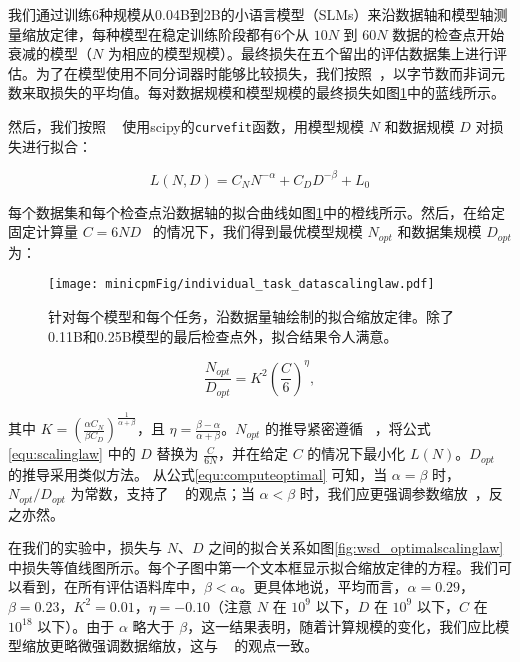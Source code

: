 我们通过训练6种规模从0.04B到2B的小语言模型（SLMs）来沿数据轴和模型轴测量缩放定律，每种模型在稳定训练阶段都有6个从 $10N$ 到 $60N$ 数据的检查点开始衰减的模型（$N$ 为相应的模型规模）。最终损失在五个留出的评估数据集上进行评估。为了在模型使用不同分词器时能够比较损失，我们按照~\cite{achiam2023gpt}，以字节数而非词元数来取损失的平均值。每对数据规模和模型规模的最终损失如图\ref{fig:individual_task_datascalinglaw}中的蓝线所示。 

然后，我们按照 ~\cite{hoffmann2022training} 使用scipy的\texttt{curvefit}函数，用模型规模 $N$ 和数据规模 $D$ 对损失进行拟合：

\begin{equation}
    L(N, D) = C_NN^{-\alpha} + C_DD^{-\beta} + L_0
\label{equ:scalinglaw}
\end{equation}

每个数据集和每个检查点沿数据轴的拟合曲线如图\ref{fig:individual_task_datascalinglaw}中的橙线所示。然后，在给定固定计算量 $C = 6ND$~\citep{rae2021scaling} 的情况下，我们得到最优模型规模 $N_{opt}$ 和数据集规模 $D_{opt}$ 为： 
\begin{figure}
    \centering
    \texttt{[image: minicpmFig/individual\_task\_datascalinglaw.pdf]}
    \caption{针对每个模型和每个任务，沿数据量轴绘制的拟合缩放定律。除了0.11B和0.25B模型的最后检查点外，拟合结果令人满意。}
    \label{fig:individual_task_datascalinglaw}
\end{figure}


\begin{equation}
    \frac{N_{opt}}{D_{opt}} = K^2\left(\frac{C}{6}\right)^{\eta},
\label{equ:computeoptimal}
\end{equation}

其中 $K = (\frac{\alpha C_N}{\beta C_D})^{\frac{1}{\alpha + \beta}} $，且 $\eta=\frac{\beta - \alpha}{\alpha + \beta}$。$N_{opt}$ 的推导紧密遵循 ~\cite{hoffmann2022training}，将公式\ref{equ:scalinglaw} 中的 $D$ 替换为 $\frac{C}{6N}$，并在给定 $C$ 的情况下最小化 $L(N)$。$D_{opt}$ 的推导采用类似方法。 
从公式\ref{equ:computeoptimal} 可知，当 $\alpha = \beta$ 时，$N_{opt}/D_{opt}$ 为常数，支持了 ~\cite{hoffmann2022training} 的观点；当 $\alpha < \beta$ 时，我们应更强调参数缩放~\citep{kaplan2020scaling}，反之亦然。 

在我们的实验中，损失与 $N$、$D$ 之间的拟合关系如图\ref{fig:wsd_optimalscalinglaw} 中损失等值线图所示。每个子图中第一个文本框显示拟合缩放定律的方程。我们可以看到，在所有评估语料库中，$\beta < \alpha$。更具体地说，平均而言，$\alpha = 0.29$，$\beta = 0.23$，$K^2 = 0.01$，$\eta = -0.10$（注意 $N$ 在 $10^9$ 以下，$D$ 在 $10^9$ 以下，$C$ 在 $10^{18}$ 以下）。由于 $\alpha$ 略大于 $\beta$，这一结果表明，随着计算规模的变化，我们应比模型缩放更略微强调数据缩放，这与 ~\cite{hoffmann2022training} 的观点一致。

